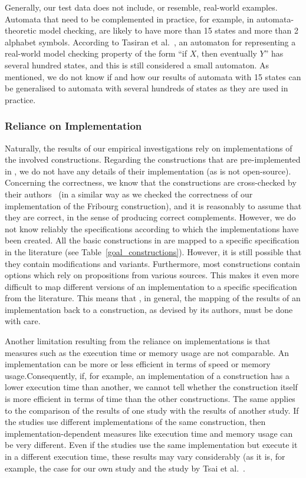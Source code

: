 Generally, our test data does not include, or resemble, real-world examples. Automata that need to be complemented in practice, for example, in automata-theoretic model checking, are likely to have more than 15 states and more than 2 alphabet symbols. According to Tasiran et al.~\cite{1995_tasiran}, an automaton for representing a real-world model checking property of the form ``if $X$, then eventually $Y$'' has several hundred states, and this is still considered a small automaton. As mentioned, we do not know if and how our results of automata with 15 states can be generalised to automata with several hundreds of states as they are used in practice.

\subsubsection{Reliance on Implementation}
Naturally, the results of our empirical investigations rely on implementations of the involved constructions. Regarding the constructions that are pre-implemented in \goal, we do not have any details of their implementation (as \goal{} is not open-source). Concerning the correctness, we know that the constructions are cross-checked by their authors~\cite{2008_goal_ext} (in a similar way as we checked the correctness of our implementation of the Fribourg construction), and it is reasonably to assume that they are correct, in the sense of producing correct complements. However, we do not know reliably the specifications according to which the implementations have been created. All the basic constructions in \goal{} are mapped to a specific specification in the literature (see Table~\ref{goal_constructions}). However, it is still possible that they contain modifications and variants. Furthermore, most constructions contain options which rely on propositions from various sources. This makes it even more difficult to map different versions of an implementation to a specific specification from the literature. This means that , in general, the mapping of the results of an implementation back to a construction, as devised by its authors, must be done with care.

Another limitation resulting from the reliance on implementations is that measures such as the execution time or memory usage are not comparable. An implementation can be more or less efficient in terms of speed or memory usage.Consequently, if, for example, an implementation of a construction has a lower execution time than another, we cannot tell whether the construction itself is more efficient in terms of time than the other constructions. The same applies to the comparison of the results of one study with the results of another study. If the studies use different implementations of the same construction, then  implementation-dependent measures like execution time and memory usage can be very different. Even if the studies use the same implementation but execute it in a different execution time, these results may vary considerably (as it is, for example, the case for our own study and the study by Tsai et al.~\cite{2011_tsai}.

